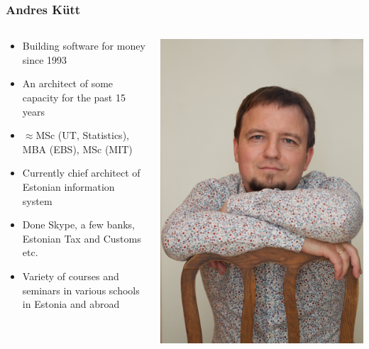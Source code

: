 \begin{frame}[fragile]
	\frametitle{Andres Kütt}
	\begin{columns}
		\begin{column}[T]{7.5cm}
			\begin{itemize}
				\item Building software for money since 1993
				\item An architect of some capacity for the past 15 years
				\item $\approx$MSc (UT, Statistics), MBA (EBS), MSc (MIT)
				\item Currently chief architect of Estonian information system
				\item Done Skype, a few banks, Estonian Tax and Customs etc. 
				\item Variety of courses and seminars in various schools in Estonia and abroad
			\end{itemize}
		\end{column}
		\begin{column}[T]{2.5cm}
			\includegraphics[width=\textwidth]{author.jpg}
		\end{column}
	\end{columns}
\end{frame}


